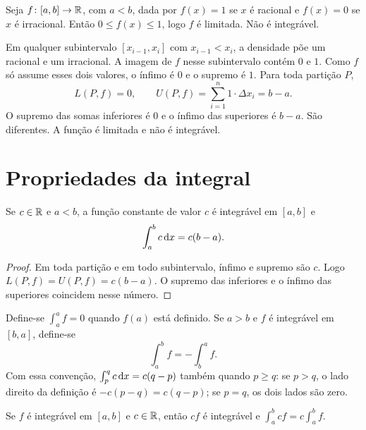 \documentclass[11pt,a4paper]{article}
\begin{document}
\begin{contraexemplo}[Dirichlet]
Seja $f\colon[a,b]\to\mathbb{R}$, com $a<b$, dada por $f(x)=1$ se $x$ é racional e $f(x)=0$ se $x$ é irracional. Então $0\le f(x)\le 1$, logo $f$ é limitada. Não é integrável.

Em qualquer subintervalo $[x_{i-1},x_i]$ com $x_{i-1}<x_i$, a densidade põe um racional e um irracional. A imagem de $f$ nesse subintervalo contém $0$ e $1$. Como $f$ só assume esses dois valores, o ínfimo é $0$ e o supremo é $1$. Para toda partição $P$,
\[
L(P,f)=0,\qquad U(P,f)=\sum_{i=1}^n 1\cdot\Delta x_i=b-a.
\]
O supremo das somas inferiores é $0$ e o ínfimo das superiores é $b-a$. São diferentes. A função é limitada e não é integrável.
\end{contraexemplo}


\section{Propriedades da integral}

\begin{lema}\label{lem:constante}
Se $c\in\mathbb{R}$ e $a<b$, a função constante de valor $c$ é integrável em $[a,b]$ e
\[
\int_a^b c\,\mathrm{d} x=c(b-a).
\]
\end{lema}

\begin{proof}
Em toda partição e em todo subintervalo, ínfimo e supremo são $c$. Logo $L(P,f)=U(P,f)=c(b-a)$. O supremo das inferiores e o ínfimo das superiores coincidem nesse número.
\end{proof}

\begin{definicao}
Define-se $\int_a^a f=0$ quando $f(a)$ está definido. Se $a>b$ e $f$ é integrável em $[b,a]$, define-se
\[
\int_a^b f=-\int_b^a f.
\]
Com essa convenção, $\int_p^q c\,\mathrm{d} x=c(q-p)$ também quando $p\ge q$: se $p>q$, o lado direito da definição é $-c(p-q)=c(q-p)$; se $p=q$, os dois lados são zero.
\end{definicao}

\begin{teorema}[Homogeneidade]\label{teo:escalar}
Se $f$ é integrável em $[a,b]$ e $c\in\mathbb{R}$, então $cf$ é integrável e $\int_a^b cf=c\int_a^b f$.
\end{teorema}
\end{document}
